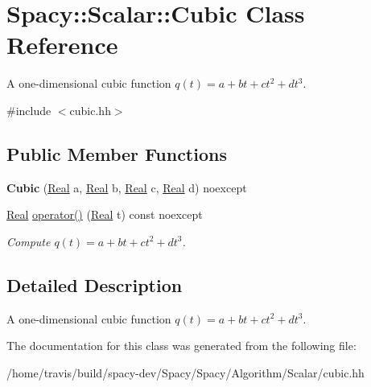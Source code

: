 \hypertarget{classSpacy_1_1Scalar_1_1Cubic}{\section{\-Spacy\-:\-:\-Scalar\-:\-:\-Cubic \-Class \-Reference}
\label{classSpacy_1_1Scalar_1_1Cubic}
}


\-A one-\/dimensional cubic function $q(t) = a + bt + ct^2 + dt^3$.  




{\ttfamily \#include $<$cubic.\-hh$>$}

\subsection*{\-Public \-Member \-Functions}
\begin{DoxyCompactItemize}
\item 
\hypertarget{classSpacy_1_1Scalar_1_1Cubic_a696ca24d2548b4b363265d635098af6f}{{\bfseries \-Cubic} (\hyperlink{classSpacy_1_1Real}{\-Real} a, \hyperlink{classSpacy_1_1Real}{\-Real} b, \hyperlink{classSpacy_1_1Real}{\-Real} c, \hyperlink{classSpacy_1_1Real}{\-Real} d) noexcept}\label{classSpacy_1_1Scalar_1_1Cubic_a696ca24d2548b4b363265d635098af6f}

\item 
\hypertarget{classSpacy_1_1Scalar_1_1Cubic_aafc854991e7d70f2057f56da861b8204}{\hyperlink{classSpacy_1_1Real}{\-Real} \hyperlink{classSpacy_1_1Scalar_1_1Cubic_aafc854991e7d70f2057f56da861b8204}{operator()} (\hyperlink{classSpacy_1_1Real}{\-Real} t) const noexcept}\label{classSpacy_1_1Scalar_1_1Cubic_aafc854991e7d70f2057f56da861b8204}

\begin{DoxyCompactList}\small\item\em \-Compute $q(t) = a + bt + ct^2 + dt^3 $. \end{DoxyCompactList}\end{DoxyCompactItemize}


\subsection{\-Detailed \-Description}
\-A one-\/dimensional cubic function $q(t) = a + bt + ct^2 + dt^3$. 

\-The documentation for this class was generated from the following file\-:\begin{DoxyCompactItemize}
\item 
/home/travis/build/spacy-\/dev/\-Spacy/\-Spacy/\-Algorithm/\-Scalar/cubic.\-hh\end{DoxyCompactItemize}

